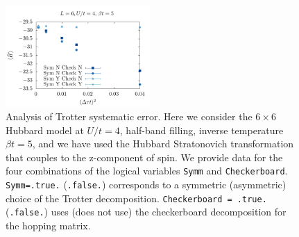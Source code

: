 \begin{figure}
\center
\includegraphics[width=0.49\textwidth]{Figures/Dtau/Dtau.pdf}

        \caption{Analysis of  Trotter systematic error.  Here we consider the $6\times 6$ Hubbard model at $U/t=4$, half-band filling,  inverse temperature $\beta t =5$, and we have used the Hubbard Stratonovich transformation that couples to the z-component of spin.     We provide data for the four combinations of  the logical variables \texttt{Symm}  and \texttt{Checkerboard}.   \texttt{Symm=.true.}    (\texttt{.false.})  corresponds to a symmetric  (asymmetric) choice  of the Trotter decomposition.  \texttt{Checkerboard = .true.}  (\texttt{.false.})   uses (does not use) the  checkerboard   decomposition  for the hopping  matrix. 
  }
        \label{Trotter.fig}
\end{figure}
